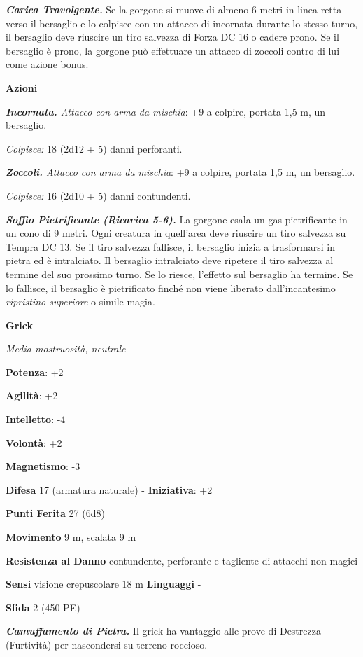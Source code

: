 \begin{multicols}{2}
\emph{\textbf{Carica Travolgente.}} Se la gorgone si muove di almeno 6
metri in linea retta verso il bersaglio e lo colpisce con un attacco di
incornata durante lo stesso turno, il bersaglio deve riuscire un tiro
salvezza di Forza DC 16 o cadere prono. Se il bersaglio è prono, la
gorgone può effettuare un attacco di zoccoli contro di lui come azione
bonus.

\textbf{Azioni}

\emph{\textbf{Incornata.} Attacco con arma da mischia}: +9 a colpire,
portata 1,5 m, un bersaglio.

\emph{Colpisce:} 18 (2d12 + 5) danni perforanti.

\emph{\textbf{Zoccoli.} Attacco con arma da mischia}: +9 a colpire,
portata 1,5 m, un bersaglio.

\emph{Colpisce:} 16 (2d10 + 5) danni contundenti.

\emph{\textbf{Soffio Pietrificante (Ricarica 5-6).}} La gorgone esala un
gas pietrificante in un cono di 9 metri. Ogni creatura in quell'area
deve riuscire un tiro salvezza su Tempra DC 13. Se il tiro
salvezza fallisce, il bersaglio inizia a trasformarsi in pietra ed è
intralciato. Il bersaglio intralciato deve ripetere il tiro salvezza al
termine del suo prossimo turno. Se lo riesce, l'effetto sul bersaglio ha
termine. Se lo fallisce, il bersaglio è pietrificato finché non viene
liberato dall'incantesimo \emph{ripristino superiore} o simile magia.

\textbf{Grick}

\emph{Media mostruosità, neutrale}

\textbf{Potenza}: +2

\textbf{Agilità}: +2

\textbf{Intelletto}: -4

\textbf{Volontà}: +2

\textbf{Magnetismo}: -3

\textbf{Difesa} 17 (armatura naturale) - \textbf{Iniziativa}: +2

\textbf{Punti Ferita} 27 (6d8)

\textbf{Movimento} 9 m, scalata 9 m

\textbf{Resistenza al Danno} contundente, perforante e tagliente di
attacchi non magici

\textbf{Sensi} visione crepuscolare 18 m
\textbf{Linguaggi} -

\textbf{Sfida} 2 (450 PE)

\emph{\textbf{Camuffamento di Pietra.}} Il grick ha vantaggio alle prove
di Destrezza (Furtività) per nascondersi su terreno roccioso.


\end{multicols}

